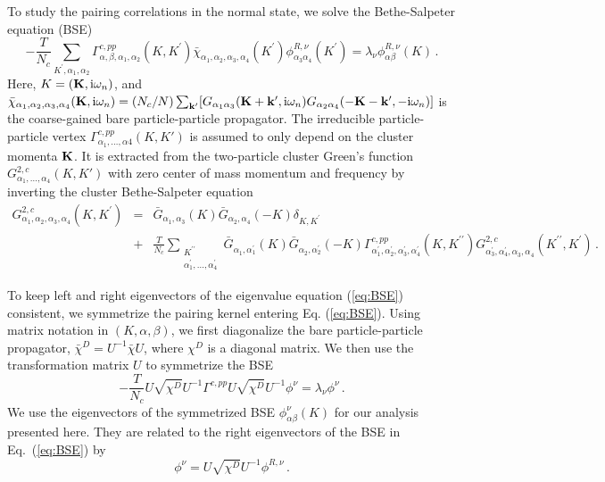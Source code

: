 \documentclass[reprint,nofootinbib,nobibnotes,amsmath,amssymb,aps,prb,floatfix]{revtex4-2}
\begin{document}
\begin{widetext}
To study the pairing correlations in the normal state, we solve the Bethe-Salpeter equation (BSE)
\begin{equation} \label{eq:BSE}
    -\frac{T}{N_c} \sum_{K^\prime,\alpha_1,\alpha_2} \Gamma^{c, pp}_{\alpha,\beta,\alpha_1,\alpha_2}(K,K^\prime)\bar{\chi}_{\alpha_1,\alpha_2,\alpha_3,\alpha_4}(K^\prime) \phi^{R,\nu}_{\alpha_3\alpha_4}(K^\prime) = \lambda_\nu \phi^{R,\nu}_{\alpha\beta}(K)\,.
\end{equation}
Here, $K=({\bf K},\text{i}\omega_n)$, and $\bar{\chi}_{\alpha_1,\alpha_2,\alpha_3,\alpha_4}({\bf K}, \text{i}\omega_n) = (N_c/N) \sum_{{\bf k}^\prime} [G_{\alpha_1\alpha_3}({\bf K+k'},\text{i}\omega_n)G_{\alpha_2\alpha_4}(-{\bf K}-{\bf k}^\prime, -\text{i}\omega_n)]$ is the coarse-gained bare particle-particle propagator. The irreducible particle-particle vertex $\Gamma^{c, pp}_{\alpha_1,\dots,\alpha4}(K,K')$ is assumed to only depend on the cluster momenta ${\bf K}$. It is extracted from the two-particle cluster Green's function $G^{2,c}_{\alpha_1,\dots,\alpha_4}(K,K')$ with zero center of mass momentum and frequency by inverting the cluster Bethe-Salpeter equation
\begin{eqnarray}\nonumber
G^{2,c}_{\alpha_1,\alpha_2,\alpha_3,\alpha_4}(K,K^\prime) &=&\bar{G}_{\alpha_1,\alpha_3}(K)\bar{G}_{\alpha_2,\alpha_4}(-K)\delta_{K,K^\prime} \\
&+&\frac{T}{N_c}\sum_{\substack{K^{\prime\prime}\\\alpha^\prime_1,\dots,\alpha^\prime_4}}\bar{G}_{\alpha^{\phantom\prime}_1,\alpha^\prime_1}(K)\bar{G}_{\alpha^{\phantom\prime}_2,\alpha^\prime_2}(-K)
\Gamma^{c,pp}_{\alpha^\prime_1,\alpha^\prime_2,\alpha^\prime_3,\alpha^\prime_4}(K,K^{\prime\prime})G^{2,c}_{\alpha^\prime_3,\alpha^\prime_4,\alpha^{\phantom\prime}_3,\alpha^{\phantom\prime}_4}(K^{\prime\prime},K^\prime)\,.
\label{BSE1}
\end{eqnarray}
\end{widetext}

To keep left and right eigenvectors of the eigenvalue equation (\ref{eq:BSE}) consistent, we symmetrize the pairing kernel entering Eq. (\ref{eq:BSE}). Using matrix notation in $(K, \alpha, \beta)$, we first diagonalize the bare particle-particle propagator, $\bar{\chi}^D = U^{-1}\bar{\chi}U$, where $\chi^D$ is a diagonal matrix. We then use the 
transformation matrix $U$ to symmetrize the BSE
\begin{equation}\label{sBSE}
-\frac{T}{N_c} U \sqrt{\chi^D}U^{-1} \Gamma^{c,pp} U \sqrt{\chi^D}U^{-1} \phi^\nu = \lambda_\nu \phi^\nu\,.
\end{equation}
We use the eigenvectors of the symmetrized BSE  $\phi^\nu_{\alpha\beta}(K)$ for our analysis presented here. 
They are related to the right eigenvectors of the BSE in 
Eq.~(\ref{eq:BSE}) by 
\begin{equation}\nonumber
    \phi^\nu = U\sqrt{\chi^D}U^{-1}\phi^{R,\nu}\,.
\end{equation}
\end{document}
